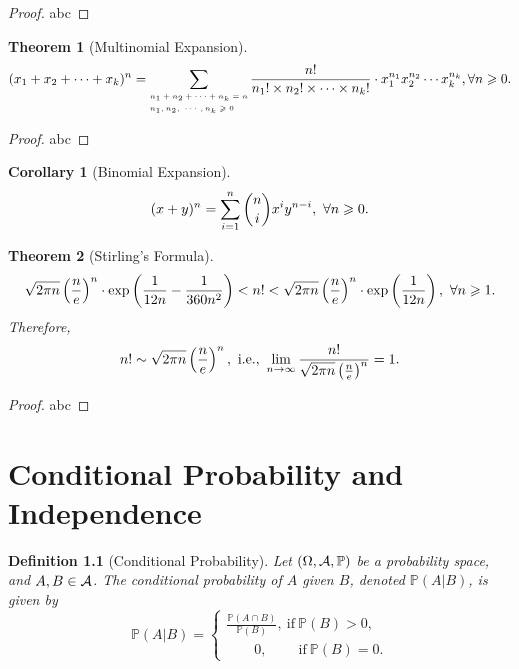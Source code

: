\documentclass[openany,12pt]{book}
\newtheorem{theorem}{Theorem}[chapter]
\newtheorem{corollary}{Corollary}[chapter]
\newtheorem{definition}{Definition}[chapter]
\begin{document}
\begin{proof}
  abc
\end{proof}

\begin{theorem}[Multinomial Expansion]
$$(x_1+x_2+\cdots+x_k )^n=\sum_
{\mbox{\tiny $\begin{aligned}
&n_1+n_2+\cdots+n_k=n \\
&n_1,n_2,\ \cdots,n_k\geqslant0
\end{aligned}$}}
 \frac{n!}{n_1 !\times n_2 !\times\cdots\times n_k !}\cdot x_1^{n_1 } x_2^{n_2 }\cdots x_k^{n_k},\forall n\geqslant0.$$
\end{theorem}

\begin{proof}
  abc
\end{proof}

\begin{corollary}[Binomial Expansion]
$$(x+y)^n=\sum_{i=1}^{n}\binom n i  x^i y^{n-i},~\forall n\geqslant 0.$$
\end{corollary}

\begin{theorem}[Stirling's Formula]
$$\sqrt{2\pi n} 
\left(\frac{n}{e}\right)^n
\cdot
\exp\left(\frac{1}{12n}-\frac{1}{360 n^2 }\right) 
<n!
<\sqrt{2\pi n} 
\left(\frac{n}{e}\right)^n
\cdot\exp\left(\frac{1}{12n}\right),\ 
\forall n\gs1.$$
Therefore, 
$$n!\sim\sqrt{2\pi n} \left(\frac{n}{e}\right)^n,\ \text{i.e.},\ \limn \frac{n!}{\sqrt{2\pi n} \left(\frac{n}{e}\right)^n}=1.$$
\end{theorem}

\begin{proof}
  abc
\end{proof}

\chapter{Conditional Probability and Independence}

\begin{definition}[Conditional Probability]
Let $(\Omega,\mathcal{A},\mathbb{P})$ be a probability space, and $A,B\in\mathcal{A}$. The conditional probability of $A$ given $B$, denoted $\mathbb{P}(A|B)$, is given by
$$\mathbb{P}(A|B)=
\begin{cases}
\frac{\mathbb{P}(A\cap B)}{\mathbb{P}(B)},\ \text{if}\  \mathbb{P}(B)>0,  \\
     \qquad 0         ,\qquad\ \text{if}\  \mathbb{P}(B)=0.
\end{cases}
$$
\end{definition}
\end{document}
